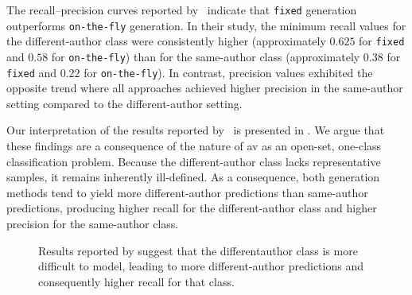 The recall–precision curves reported by \citet{koppel_determining_2014}\ indicate that \texttt{fixed} \imp{} generation outperforms \texttt{on-the-fly} \imp{} generation.
In their study, the minimum recall values for the different-author class were consistently higher (approximately $0.625$ for \texttt{fixed} and $0.58$ for \texttt{on-the-fly}) than for the same-author class (approximately $0.38$ for \texttt{fixed} and $0.22$ for \texttt{on-the-fly}).
In contrast, precision values exhibited the opposite trend where all approaches achieved higher precision in the same-author setting compared to the different-author setting.

Our interpretation of the results reported by \citet{koppel_determining_2014}\ is presented in .
We argue that these findings are a consequence of the nature of \ac{av} as an open-set, one-class classification problem.
Because the different-author class lacks representative samples, it remains inherently ill-defined.
As a consequence, both \imp{} generation methods tend to yield more different-author predictions than same-author predictions, producing higher recall for the different-author class and higher precision for the same-author class.

\begin{figure}[htbp]
    \centering
    
    \caption[Aggregating original \impAppr{} experiment results]{Results reported by \citet{koppel_determining_2014} suggest that the different\-author class is more difficult to model, leading to more different-author predictions and consequently higher recall for that class.}
    \label{fig:findings_original_work}
\end{figure}


